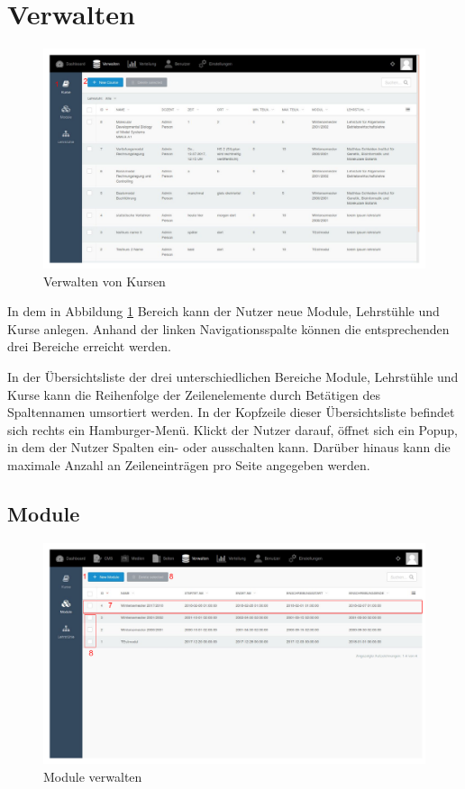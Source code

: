   
  \section{Verwalten}
  \label{section:manage}
  
    \begin{figure}
    	\centering
    	\includegraphics[scale=0.5]{backend/img/verwalten_kurse.pdf}
    	\caption{Verwalten von Kursen}
    	\label{fig:manage_courses}
    \end{figure}

    In dem in Abbildung \ref{fig:manage_courses} Bereich kann der Nutzer neue Module, Lehrstühle und Kurse anlegen.
    Anhand der linken Navigationsspalte können die entsprechenden drei Bereiche erreicht werden.

    In der Übersichtsliste der drei unterschiedlichen Bereiche Module, Lehrstühle und Kurse kann die Reihenfolge der Zeilenelemente durch Betätigen
    des Spaltennamen umsortiert werden.
    In der Kopfzeile dieser Übersichtsliste befindet sich rechts ein Hamburger-Menü. 
    Klickt der Nutzer darauf, öffnet sich ein Popup, in dem der Nutzer Spalten ein- oder ausschalten kann.
    Darüber hinaus kann die maximale Anzahl an Zeileneinträgen pro Seite angegeben werden.
    
    \subsection{Module}
    
    \begin{figure}
    	\centering
    	\includegraphics[scale=0.5]{backend/img/module_1.pdf}
    	\caption{Module verwalten}
    	\label{fig:manage_module}
    \end{figure}

